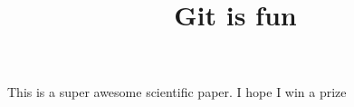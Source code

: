 \documentclass[10pt]{article}
\title{Git is fun}
\begin{document}
	\maketitle

	This is a super awesome scientific paper.
	I hope I win a prize
\end{document}
